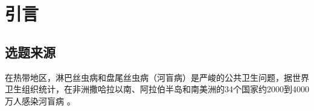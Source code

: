 \newpage
\section{引言}

\subsection{选题来源}

在热带地区，淋巴丝虫病和盘尾丝虫病（河盲病）是严峻的公共卫生问题，据世界卫生组织统计，在非洲撒哈拉以南、阿拉伯半岛和南美洲的34个国家约2000到4000万人感染河盲病 \cite{Takougang2002Rapid} 。

\lipsum[1]
\lipsum[2]
\lipsum[3]
\lipsum[4]
\lipsum[5]
\lipsum[6]
\lipsum[7]




